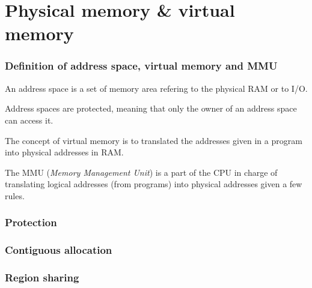\section{Physical memory \& virtual memory}


\begin{frame}
  \frametitle{Definition of address space, virtual memory and MMU}

  An address space is a set of memory area refering to the physical
  RAM or to I/O.

  \-

  Address spaces are protected, meaning that only the owner of an
  address space can access it.

  \-

  The concept of virtual memory is to translated the addresses given
  in a program into physical addresses in RAM.

  \-

  The MMU (\emph{Memory Management Unit}) is a part of the CPU in
  charge of translating logical addresses (from programs) into
  physical addresses given a few rules.

\end{frame}


\begin{frame}
  \frametitle{Protection}

  \begin{center}
  \end{center}

\end{frame}


\begin{frame}
  \frametitle{Contiguous allocation}

  \begin{center}
  \end{center}

\end{frame}


\begin{frame}
  \frametitle{Region sharing}

  \begin{center}
  \end{center}

\end{frame}

